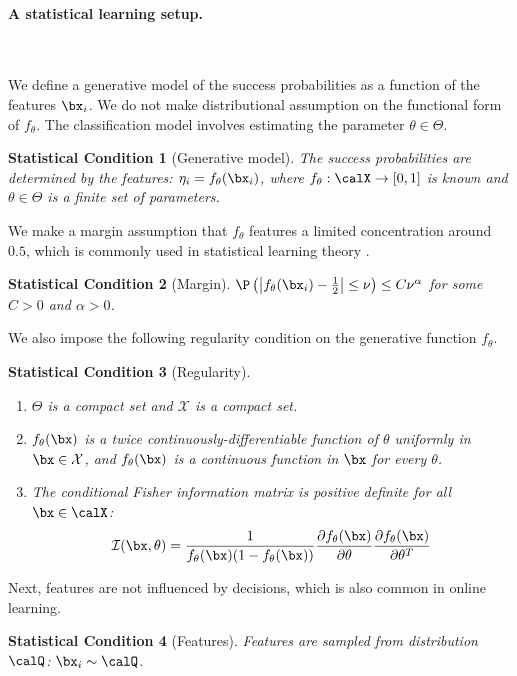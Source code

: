 \documentclass[11pt]{article}
\newtheorem{stat}{Statistical Condition}[]
\begin{document}
\paragraph{A statistical learning setup.}\

We define a generative model of the success probabilities as a function of the features $\bx_{i}$. We do not make distributional assumption on the functional form of $f_\theta$. The classification model involves estimating the parameter $\theta\in\Theta$.
\setcounter{stat}{0}
\begin{stat}[Generative model]\label{ass:known_R2}
The success probabilities are determined by the features: $\eta_{i} = f_\theta(\bx_{i})$, where $f_\theta:\calX\to[0,1]$ is known and $\theta\in\Theta$ is a finite set of parameters. 
\end{stat}

We make a margin assumption that $f_\theta$ features a limited concentration around $0.5$, which is commonly used in statistical learning theory \citep[e.g.,][]{boucheron2005theory, tsybakov2004optimal}.
\begin{stat}[Margin]\label{ass:margin_R2}
$\P\left(\left|f_\theta(\bx_{i})-\frac{1}{2}\right|\leq\nu\right)\leq C \nu^{\alpha}$ for some $C>0$ and $\alpha>0$.
\end{stat}

We also impose the following regularity condition on the generative function $f_\theta$.
\begin{stat}[Regularity]\label{ass:regularity_R2}
\begin{enumerate}
    \item $\Theta$ is a compact set and $\mathcal{X}$ is a compact set.
    \item $f_\theta(\bx)$ is a twice continuously-differentiable function of $\theta$ uniformly in $\bx \in \mathcal{X}$, and $f_\theta(\bx)$ is a continuous function in $\bx$ for every $\theta$. 
    \item The conditional Fisher information matrix is positive definite for all $\bx\in\calX$:
    \[\mathcal{I}(\bx,\theta) = \frac{1}{f_\theta(\bx)(1-f_\theta(\bx))}\frac{\partial f_\theta(\bx)}{\partial \theta}\frac{\partial f_\theta(\bx)}{\partial \theta^T} \]
\end{enumerate}
\end{stat}

Next, features are not influenced by decisions, which is also common in online learning.

\begin{stat}[Features]\label{ass:features_R2}
    Features are sampled from distribution $\calQ$:
    $\bx_{i}\sim \calQ$.
\end{stat}
\end{document}
